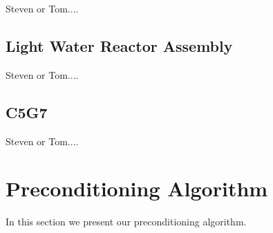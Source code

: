 \documentclass[letterpaper,11pt]{article}
\begin{document}
Steven or Tom....

\subsection{Light Water Reactor Assembly}

Steven or Tom....

\subsection{C5G7}

Steven or Tom....

\section{Preconditioning Algorithm}
In this section we present our preconditioning algorithm.
\end{document}
